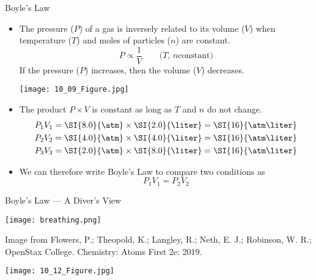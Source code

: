 \documentclass[handout]{beamer}
\begin{document}
\begin{frame}[allowframebreaks]{Boyle's Law}
		\begin{itemize}
			\item The pressure ($P$) of a gas is \alert{inversely} related to
				its volume ($V$) when temperature ($T$) and moles of
				particles ($n$) are constant.
				\begin{equation*}
					P \propto \frac{1}{V} \qquad \text{($T$, $n$
					constant)}
				\end{equation*}
				If the pressure ($P$) increases, then the volume ($V$)
				decreases.
					\bigskip

				\begin{center}
					\texttt{[image: 10\_09\_Figure.jpg]}
				\end{center}
			\item The product $P \times V$ is \alert{constant} as long as $T$
				and $n$ \alert{do not change}.
				\begin{align*}
					P_1V_1 &= \SI{8.0}{\atm} \times \SI{2.0}{\liter}
					= \SI{16}{\atm\liter} \\
					P_2V_2 &= \SI{4.0}{\atm} \times \SI{4.0}{\liter}
					= \SI{16}{\atm\liter} \\
					P_3V_3 &= \SI{2.0}{\atm} \times \SI{8.0}{\liter}
					= \SI{16}{\atm\liter}
			\end{align*}
			\item We can therefore write Boyle's Law to compare two
				conditions as
				\begin{equation*}
					P_1V_1 = P_2V_2			
				\end{equation*}
		\end{itemize}
\end{frame}

\begin{frame}{Boyle's Law --- A Diver's View}
		\begin{center}
			\texttt{[image: breathing.png]}
		\end{center}
	
		\footnotesize{%
		Image from Flowers, P.; Theopold, K.; Langley, R.; Neth, E. J.; Robinson, W. R.;
		OpenStax College. Chemistry: Atoms First 2e; 2019.
	}
\end{frame}

\begin{frame}
	\begin{center}
		\texttt{[image: 10\_12\_Figure.jpg]}
	\end{center}
\end{frame}
\end{document}
